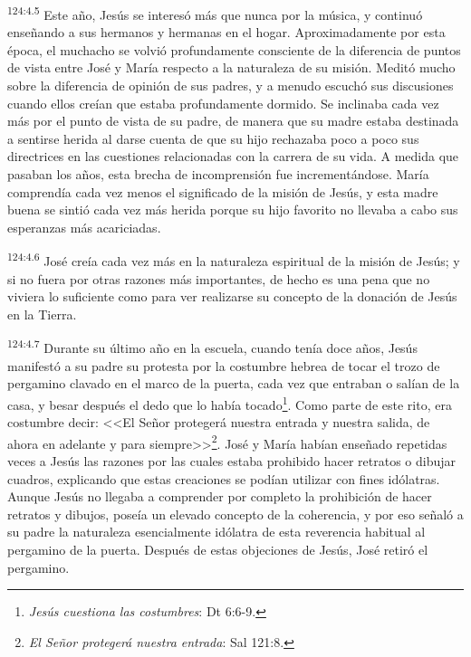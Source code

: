 \par 
\textsuperscript{124:4.5} Este año, Jesús se interesó más que nunca por la música, y continuó enseñando a sus hermanos y hermanas en el hogar. Aproximadamente por esta época, el muchacho se volvió profundamente consciente de la diferencia de puntos de vista entre José y María respecto a la naturaleza de su misión. Meditó mucho sobre la diferencia de opinión de sus padres, y a menudo escuchó sus discusiones cuando ellos creían que estaba profundamente dormido. Se inclinaba cada vez más por el punto de vista de su padre, de manera que su madre estaba destinada a sentirse herida al darse cuenta de que su hijo rechazaba poco a poco sus directrices en las cuestiones relacionadas con la carrera de su vida. A medida que pasaban los años, esta brecha de incomprensión fue incrementándose. María comprendía cada vez menos el significado de la misión de Jesús, y esta madre buena se sintió cada vez más herida porque su hijo favorito no llevaba a cabo sus esperanzas más acariciadas.

\par 
\textsuperscript{124:4.6} José creía cada vez más en la naturaleza espiritual de la misión de Jesús; y si no fuera por otras razones más importantes, de hecho es una pena que no viviera lo suficiente como para ver realizarse su concepto de la donación de Jesús en la Tierra.

\par 
\textsuperscript{124:4.7} Durante su último año en la escuela, cuando tenía doce años, Jesús manifestó a su padre su protesta por la costumbre hebrea de tocar el trozo de pergamino clavado en el marco de la puerta, cada vez que entraban o salían de la casa, y besar después el dedo que lo había tocado\footnote{\textit{Jesús cuestiona las costumbres}: Dt 6:6-9.}. Como parte de este rito, era costumbre decir: <<El Señor protegerá nuestra entrada y nuestra salida, de ahora en adelante y para siempre>>\footnote{\textit{El Señor protegerá nuestra entrada}: Sal 121:8.}. José y María habían enseñado repetidas veces a Jesús las razones por las cuales estaba prohibido hacer retratos o dibujar cuadros, explicando que estas creaciones se podían utilizar con fines idólatras. Aunque Jesús no llegaba a comprender por completo la prohibición de hacer retratos y dibujos, poseía un elevado concepto de la coherencia, y por eso señaló a su padre la naturaleza esencialmente idólatra de esta reverencia habitual al pergamino de la puerta. Después de estas objeciones de Jesús, José retiró el pergamino.

